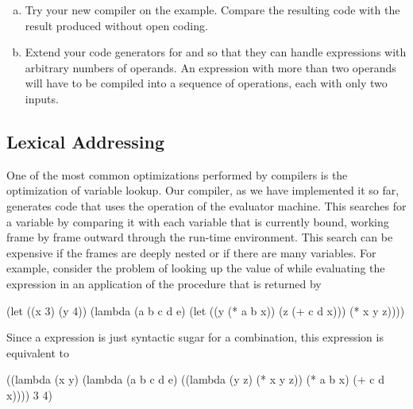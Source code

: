 \begin{exerciseGroup}
\begin{enumerate}[a.]
\item
Try your new compiler on the  example.  Compare the resulting
code with the result produced without open coding.

\item
Extend your code generators for \code{+} and \code{*} so that they can handle
expressions with arbitrary numbers of operands.  An expression with more than
two operands will have to be compiled into a sequence of operations, each with
only two inputs.

\end{enumerate}
\end{exerciseGroup}

\subsection{Lexical Addressing}
\label{Section 5.5.6}

One of the most common optimizations performed by compilers is the optimization
of variable lookup.  Our compiler, as we have implemented it so far, generates
code that uses the  operation of the evaluator
machine.  This searches for a variable by comparing it with each variable that
is currently bound, working frame by frame outward through the run-time
environment.  This search can be expensive if the frames are deeply nested or
if there are many variables.  For example, consider the problem of looking up
the value of  while evaluating the expression  in an
application of the procedure that is returned by

\begin{codeBlock}
(let ((x 3) (y 4))
  (lambda (a b c d e)
    (let ((y (* a b x)) (z (+ c d x)))
      (* x y z))))
\end{codeBlock}

\noindent
Since a  expression is just syntactic sugar for a 
combination, this expression is equivalent to

\begin{codeBlock}
((lambda (x y)
   (lambda (a b c d e)
     ((lambda (y z) (* x y z))
      (* a b x)
      (+ c d x))))
 3
 4)
\end{codeBlock}

